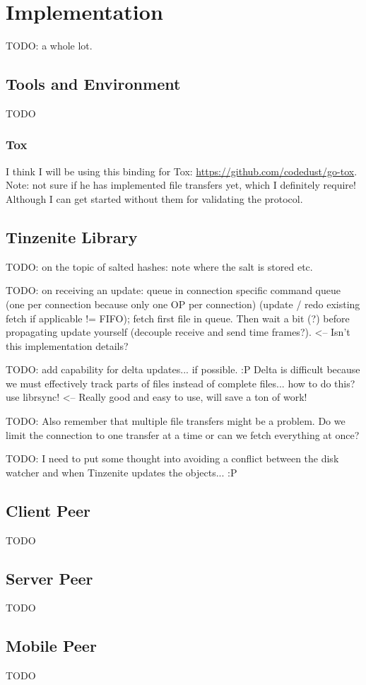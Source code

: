 \chapter{Implementation}
\label{chap:implementation}

TODO: a whole lot.

\section{Tools and Environment}

TODO

\subsection{Tox}
\label{sub:Tox}

I think I will be using this binding for Tox: \url{https://github.com/codedust/go-tox}.
Note: not sure if he has implemented file transfers yet, which I definitely require!
Although I can get started without them for validating the protocol.

\section{Tinzenite Library}

TODO: on the topic of salted hashes: note where the salt is stored etc.

TODO: on receiving an update: queue in connection specific command queue (one per connection because only one OP per connection) (update / redo existing fetch if applicable != FIFO); fetch first file in queue.
Then wait a bit (?) before propagating update yourself (decouple receive and send time frames?). <-- Isn't this implementation details?

TODO: add capability for delta updates... if possible. :P
Delta is difficult because we must effectively track parts of files instead of complete files... how to do this?
use librsync! <-- Really good and easy to use, will save a ton of work!

TODO: Also remember that multiple file transfers might be a problem.
Do we limit the connection to one transfer at a time or can we fetch everything at once?

TODO: I need to put some thought into avoiding a conflict between the disk watcher and when Tinzenite updates the objects... :P

\section{Client Peer}

TODO

\section{Server Peer}

TODO

\section{Mobile Peer}

TODO
